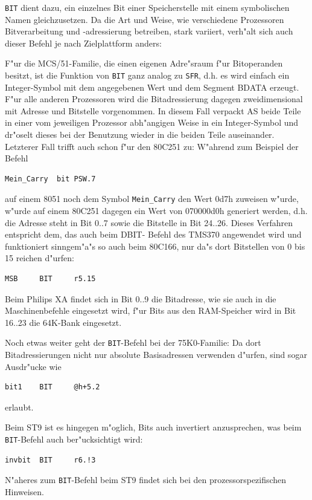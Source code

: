 \documentclass[12pt,a4paper,twoside]{report}
\newcommand{\tty}[1]{{\tt #1}}
\newcommand{\asname}{AS}
\begin{document}
\tty{BIT} dient dazu, ein einzelnes Bit einer Speicherstelle mit einem
symbolischen Namen gleichzusetzen.  Da die Art und Weise, wie
verschiedene Prozessoren Bitverarbeitung und -adressierung betreiben,
stark variiert, verh"alt sich auch dieser Befehl je nach Zielplattform
anders:
\par
F"ur die MCS/51-Familie, die einen eigenen Adre"sraum f"ur Bitoperanden
besitzt, ist die Funktion von \tty{BIT} ganz analog zu \tty{SFR}, d.h.
es wird einfach ein Integer-Symbol mit dem angegebenen Wert und dem
Segment BDATA erzeugt.  F"ur alle anderen Prozessoren wird die
Bitadressierung dagegen zweidimensional mit Adresse und Bitstelle
vorgenommen.  In diesem Fall verpackt \asname{} beide Teile in einer vom
jeweiligen Prozessor abh"angigen Weise in ein Integer-Symbol und dr"oselt
dieses bei der Benutzung wieder in die beiden Teile auseinander.
Letzterer Fall trifft auch schon f"ur den 80C251 zu:  W"ahrend zum Beispiel
der Befehl
\begin{verbatim}
Mein_Carry	bit	PSW.7
\end{verbatim}
auf einem 8051 noch dem Symbol \tty{Mein\_Carry} den Wert 0d7h zuweisen
w"urde, w"urde auf einem 80C251 dagegen ein Wert von 070000d0h generiert
werden, d.h. die Adresse steht in Bit  0..7 sowie die Bitstelle in Bit
24..26.  Dieses Verfahren entspricht dem, das auch beim DBIT-
Befehl des TMS370 angewendet wird und funktioniert sinngem"a"s so auch
beim 80C166, nur da"s dort Bitstellen von 0 bis 15 reichen d"urfen:
\begin{verbatim}
MSB     BIT     r5.15
\end{verbatim}
Beim Philips XA findet sich in Bit 0..9 die Bitadresse, wie sie auch
in die Maschinenbefehle eingesetzt wird, f"ur Bits aus den RAM-Speicher
wird in Bit 16..23 die 64K-Bank eingesetzt.
\par
Noch etwas weiter geht der \tty{BIT}-Befehl bei der 75K0-Familie: Da
dort Bitadressierungen nicht nur absolute Basisadressen verwenden
d"urfen, sind sogar Ausdr"ucke wie
\begin{verbatim}
bit1    BIT     @h+5.2
\end{verbatim}
erlaubt.
\par
Beim ST9 ist es hingegen m"oglich, Bits auch invertiert anzusprechen,
was beim \tty{BIT}-Befehl auch ber"ucksichtigt wird:
\begin{verbatim}
invbit  BIT     r6.!3
\end{verbatim}
N"aheres zum \tty{BIT}-Befehl beim ST9 findet sich bei den
prozessorspezifischen Hinweisen.
\end{document}
